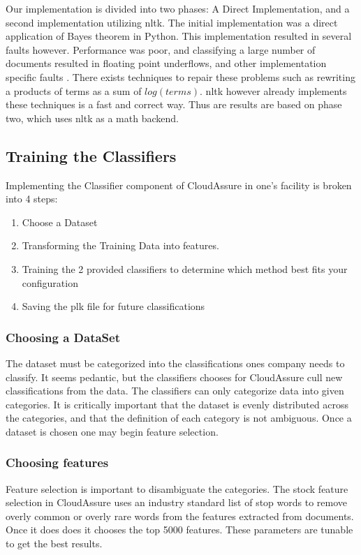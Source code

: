 Our implementation is divided into two phases: A Direct Implementation, and
a second implementation utilizing \gls{nltk}. The initial implementation was
a direct application of Bayes theorem in Python. This implementation resulted in
several faults however. Performance was poor, and classifying a large number of
documents resulted in floating point underflows, and other implementation
specific faults \autocite{Graham-Cummings2005}. There exists techniques to repair these problems such as
rewriting a products  of terms as a sum of \(log(terms) \). \gls{nltk} however
already implements these techniques is a fast and correct way. Thus are results
are based on phase two, which uses \gls{nltk} as a math backend.\autocite{Denoyer2004}

\subsection{Training the Classifiers}
Implementing the Classifier component of CloudAssure in one's facility is broken
into 4 steps:
\begin{enumerate}
    \item Choose a Dataset
    \item Transforming the Training Data into features.
    \item Training the 2 provided classifiers to determine which method best
        fits your configuration
    \item Saving the plk file for future classifications
\end{enumerate}

\subsubsection{Choosing a DataSet}
The dataset must be categorized into the classifications ones company needs to
classify. It seems pedantic, but the classifiers chooses for CloudAssure cull
new classifications from the data. The classifiers can only categorize data into
given categories. It is critically important that the dataset is evenly distributed across the
categories, and that the definition of each category is not ambiguous. 
Once a dataset is chosen one may begin feature selection.

\subsubsection{Choosing features}
Feature selection is important to disambiguate the categories. The stock feature
selection in CloudAssure uses an industry standard list of stop words to remove
overly common or overly rare words from the features extracted from documents.
Once it does does it chooses the top 5000 features. These parameters are tunable
 to get the best results.

